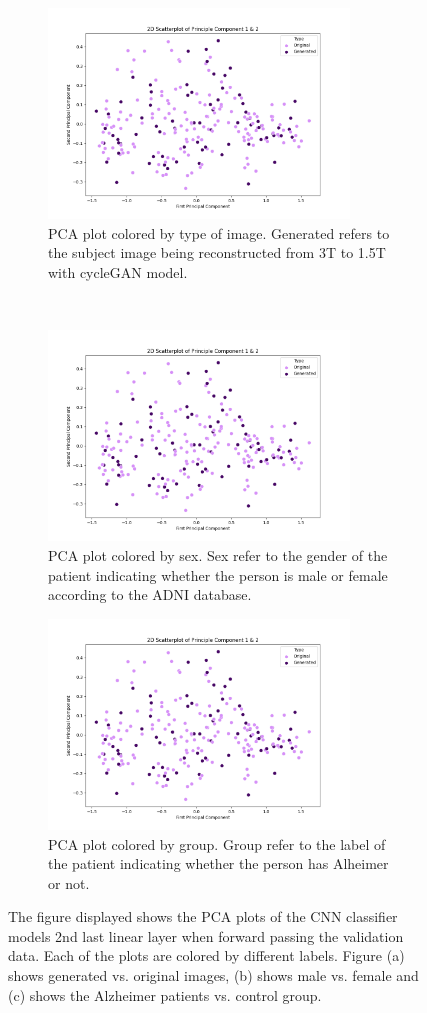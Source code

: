\documentclass[12pt, fleqn, titlepage]{article}
\newcommand{\1}[1]{\mathds{1}\left[#1\right]}
\begin{document}
\begin{figure}[H]
	\centering
	\begin{subfigure}[t]{0.59\textwidth}
		\centering
		\includegraphics[height=2.2in]{imgs/classifier/with_generated_imgs_pca_type}%
		\caption{PCA plot colored by type of image. Generated refers to the subject image being reconstructed from 3T to 1.5T with cycleGAN model.}
	\end{subfigure}%
	~
	\begin{subfigure}[t]{0.5\textwidth}
		\centering
		\includegraphics[height=2.2in]{imgs/classifier/with_generated_imgs_pca_sex}%
		\caption{PCA plot colored by sex. Sex refer to the gender of the patient indicating whether the person is male or female according to the ADNI database.}	
	\end{subfigure}
	\begin{subfigure}[t]{0.5\textwidth}
		\centering
		\includegraphics[height=2.2in]{imgs/classifier/with_generated_imgs_pca_group}%
		\caption{PCA plot colored by group. Group refer to the label of the patient indicating whether the person has Alheimer or not.}
	\end{subfigure}
	\label{fig:type_1}
	\caption{The figure displayed shows the PCA plots of the CNN classifier models 2nd last linear layer when forward passing the validation data. Each of the plots are colored by different labels. Figure (a) shows generated vs. original images, (b) shows male vs. female and (c) shows the Alzheimer patients vs. control group. }
\end{figure}
\end{document}
